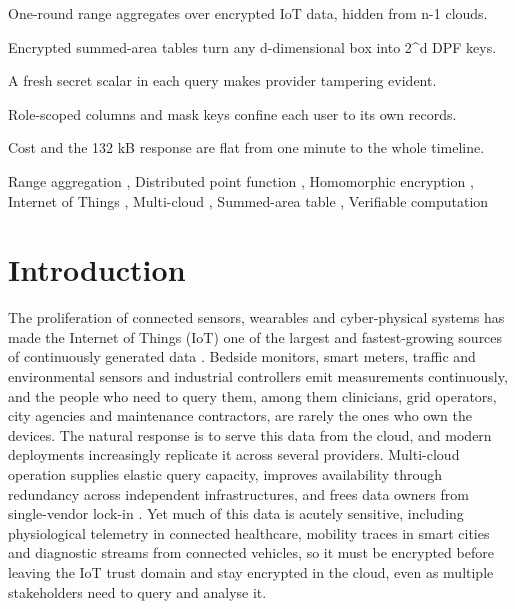 \documentclass[a4paper,fleqn]{cas-sc}
\newif\ifanonymous
\begin{document}
\ifanonymous\else
\begin{highlights}
\item One-round range aggregates over encrypted IoT data, hidden from n-1 clouds.
\item Encrypted summed-area tables turn any d-dimensional box into 2^d DPF keys.
\item A fresh secret scalar in each query makes provider tampering evident.
\item Role-scoped columns and mask keys confine each user to its own records.
\item Cost and the 132 kB response are flat from one minute to the whole timeline.
\end{highlights}
\fi

\begin{keywords}
Range aggregation \sep
Distributed point function \sep
Homomorphic encryption \sep
Internet of Things \sep
Multi-cloud \sep
Summed-area table \sep
Verifiable computation
\end{keywords}

\maketitle

\section{Introduction}
\label{sec:intro}

The proliferation of connected sensors, wearables and cyber-physical systems
has made the Internet of Things (IoT) one of the largest and fastest-growing
sources of continuously generated data \citep{atzori2010internet}. Bedside
monitors, smart meters, traffic and environmental sensors and industrial
controllers emit measurements continuously, and the people who need to query
them, among them clinicians, grid operators, city agencies and maintenance
contractors, are rarely the ones who own the devices. The natural response is
to serve this data from the cloud, and modern deployments increasingly
replicate it across several providers. Multi-cloud operation supplies elastic
query capacity, improves availability through redundancy across independent
infrastructures, and frees data owners from single-vendor lock-in
\citep{petcu2013multicloud,grozev2014intercloud}. Yet much of this data is
acutely sensitive, including physiological telemetry in connected healthcare,
mobility traces in smart cities and diagnostic streams from connected
vehicles, so it must be encrypted before leaving the IoT trust domain and stay
encrypted in the cloud, even as multiple stakeholders need to query and
analyse it.
\end{document}
